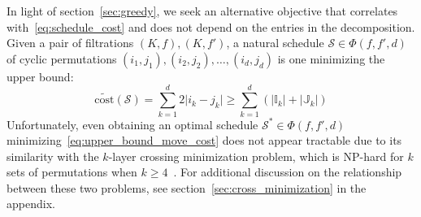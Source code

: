 \documentclass[sn-mathphys]{sn-jnl}
\DeclareMathOperator*{\argmin}{arg\,min}
\begin{document}
In light of section~\ref{sec:greedy}, we seek an alternative objective that correlates with~\eqref{eq:schedule_cost} and does not depend on the entries in the decomposition.
Given a pair of filtrations $(K, f), (K,f')$, a natural schedule $\mathcal{S} \in \Phi(f,f',d)$ of cyclic permutations $(i_1, j_1), (i_2, j_2), \dots, (i_d, j_d)$ is one minimizing the upper bound:
\begin{equation}\label{eq:upper_bound_move_cost}
\mathrm{\widetilde{cost}}(\mathcal{S}) = \sum\limits_{k=1}^d 2 \lvert i_k - j_k \rvert \geq \sum\limits_{k=1}^d ( \lvert \mathbb{I}_k \rvert + \lvert \mathbb{J}_k\rvert )
\end{equation}
Unfortunately, even obtaining an optimal schedule $\mathcal{S}^\ast \in \Phi(f,f',d)$ minimizing~\eqref{eq:upper_bound_move_cost}
does not appear tractable due to its similarity with the $k$-layer crossing minimization problem, which is NP-hard for $k$ sets of permutations when $k \geq 4$~\cite{biedl2009complexity}. For additional discussion on the relationship between these two problems, see section~\ref{sec:cross_minimization} in the appendix.
\end{document}
